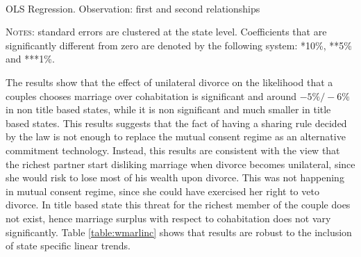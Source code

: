\documentclass[12pt]{article}
\numberwithin{table}{section}
\begin{document}
	\begin{table}[htbp]\centering
		\caption{\\OLS Regression. Observation: first and second relationships}
		\label{table:wmarc}
		\begin{threeparttable}[t]\centering
			
			\begin{tablenotes}[flushleft]
				\footnotesize{\item \textsc{Notes}: standard errors are clustered at the state level.
					Coefficients that are significantly different from zero are denoted by the following system: *10\%, **5\%  and ***1\%.}
			\end{tablenotes}
		\end{threeparttable}
	\end{table}
\FloatBarrier
The results show that the effect of unilateral divorce on the likelihood that a couples chooses marriage over cohabitation is significant and around $-5\%/-6\%$ in non title based states, while it is non significant and much smaller in title based states. This results suggests that the fact of having a sharing rule decided by the law is not enough to replace the mutual consent regime as an alternative commitment technology. Instead, this results are consistent with the view that the richest partner start disliking marriage when divorce becomes unilateral, since she would risk to lose most of his wealth upon divorce. This was not happening in mutual consent regime, since she could have exercised her right to veto divorce. In title based state this threat for the richest member of the couple does not exist, hence marriage surplus with respect to cohabitation does not vary significantly. Table \ref{table:wmarlinc} shows that results are robust to the inclusion of state specific linear trends.
\end{document}
